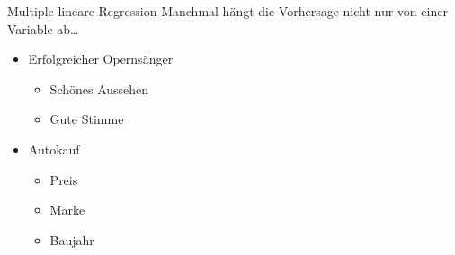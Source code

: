 \begin{frame}{Multiple lineare Regression}
	Manchmal hängt die Vorhersage nicht nur von einer Variable ab\dots
	\begin{itemize}[<+->]
		\item Erfolgreicher Opernsänger 
		      \begin{itemize}
			      \item Schönes Aussehen 
			      \item Gute Stimme 
		      \end{itemize}
		\item Autokauf 
		      \begin{itemize}
			      \item Preis 
			      \item Marke 
			      \item Baujahr 
		      \end{itemize}
	\end{itemize}

\end{frame}

